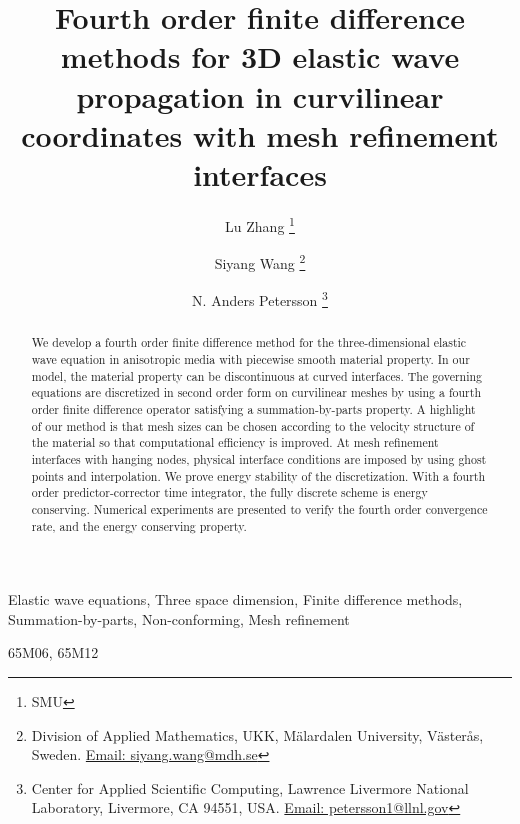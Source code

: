 \documentclass[review,onefignum,onetabnum]{siamart171218}
\title{Fourth order finite difference methods for  3D elastic wave propagation in curvilinear coordinates with mesh refinement interfaces}
\begin{document}
\author{Lu Zhang \thanks{SMU}\and Siyang Wang \thanks{Division of Applied Mathematics, UKK, M\"alardalen University, V\"aster\aa s, 
    Sweden. \href{mailto:siyang.wang@chalmers.se}{Email: siyang.wang@mdh.se}}\and N. Anders
  Petersson \thanks{Center for Applied Scientific Computing, Lawrence Livermore National Laboratory,
    Livermore, CA 94551, USA. \href{mailto:petersson1@llnl.gov}{Email: petersson1@llnl.gov}}}
\maketitle


\begin{abstract}
We develop a fourth order finite difference method for the three-dimensional elastic wave equation in anisotropic media with piecewise smooth material property. In our model, the material property can be discontinuous at curved interfaces. The governing equations are discretized in second order form on curvilinear meshes by using a fourth order finite difference operator satisfying a summation-by-parts property. A highlight of our method is that mesh sizes can be chosen according to the velocity structure of the material so that computational efficiency is improved. At mesh refinement interfaces with hanging nodes, physical interface conditions are imposed by using ghost points and interpolation. We prove energy stability of the discretization.  With a fourth order predictor-corrector time integrator, the fully discrete scheme is energy conserving. Numerical experiments are presented to verify the fourth order convergence rate, and the energy conserving property. 
\end{abstract}

\begin{keywords}
Elastic wave equations, Three space dimension,  Finite difference methods, Summation-by-parts, Non-conforming, Mesh refinement
\end{keywords}

\begin{AMS}
  65M06, 65M12
\end{AMS}
































\end{document}
